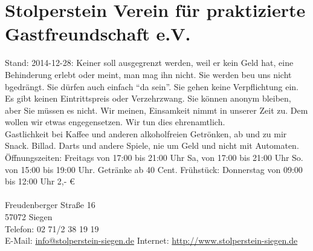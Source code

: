 \section{Stolperstein Verein für praktizierte Gastfreundschaft e.V.}
Stand: 2014-12-28: Keiner soll ausgegrenzt werden, weil er kein Geld hat, eine Behinderung erlebt oder meint, man mag ihn nicht. Sie werden beu uns nicht bgedrängt. Sie dürfen auch einfach \enquote{da sein}. Sie gehen keine Verpflichtung ein. Es gibt keinen Eintrittspreis oder Verzehrzwang. Sie können anonym bleiben, aber Sie müssen es nicht. Wir meinen, Einsamkeit nimmt in unserer Zeit zu. Dem wollen wir etwas engegensetzen. Wir tun dies ehrenamtlich.\\
Gastlichkeit bei Kaffee und anderen alkoholfreien Getrönken, ab und zu mir Snack. Billad. Darts und andere Spiele, nie um Geld und nicht mit Automaten.\\
Öffnungszeiten: Freitags von 17:00 bis 21:00 Uhr Sa, von  17:00 bis 21:00 Uhr So. von 15:00 bis 19:00 Uhr. Getränke ab 40 Cent. Frühstück: Donnerstag von 09:00 bis 12:00 Uhr 2,- \euro \\
\\
Freudenberger Straße 16\\
57072 Siegen\\
Telefon: 02 71/2 38 19 19\\
E-Mail: \href{mailto:info@stolperstein-siegen.de}{info@stolperstein-siegen.de}
Internet: \href{http://www.stolperstein-siegen.de}{http://www.stolperstein-siegen.de} 